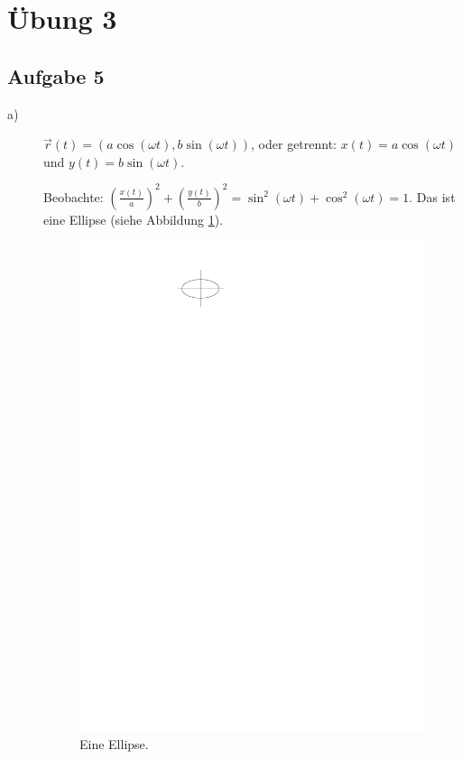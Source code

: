 \chapter*{Übung 3}

\section*{Aufgabe 5}

\begin{description}
	\item[a)] $\vec{r}(t) = (a \cos(\omega t), b \sin(\omega t))$, oder getrennt: $x(t) = a \cos(\omega t)$ und $y(t) = b \sin(\omega t)$.

Beobachte: $\left( \frac{x(t)}{a} \right)^2 + \left( \frac{y(t)}{b} \right)^2 = \sin^2(\omega t) + \cos^2(\omega t) = 1$. Das ist eine Ellipse (siehe Abbildung \ref{fig:ueb3_aufgabe5a}).

	\begin{figure}[h]
		\centering
		\includegraphics{figures/ueb3/aufgabe5a}
		\caption{Eine Ellipse.}
		\label{fig:ueb3_aufgabe5a}
	\end{figure}


\end{description}
